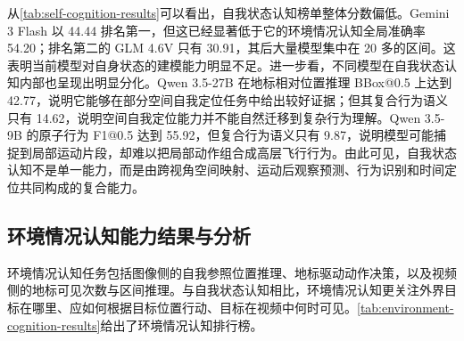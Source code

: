 从\autoref{tab:self-cognition-results}可以看出，自我状态认知榜单整体分数偏低。Gemini 3 Flash 以 44.44 排名第一，但这已经显著低于它的环境情况认知全局准确率 54.20；排名第二的 GLM 4.6V 只有 30.91，其后大量模型集中在 20 多的区间。这表明当前模型对自身状态的建模能力明显不足。进一步看，不同模型在自我状态认知内部也呈现出明显分化。Qwen 3.5-27B 在地标相对位置推理 BBox@0.5 上达到 42.77，说明它能够在部分空间自我定位任务中给出较好证据；但其复合行为语义只有 14.62，说明空间自我定位能力并不能自然迁移到复杂行为理解。Qwen 3.5-9B 的原子行为 F1@0.5 达到 55.92，但复合行为语义只有 9.87，说明模型可能捕捉到局部运动片段，却难以把局部动作组合成高层飞行行为。由此可见，自我状态认知不是单一能力，而是由跨视角空间映射、运动后观察预测、行为识别和时间定位共同构成的复合能力。

\subsection{环境情况认知能力结果与分析}

环境情况认知任务包括图像侧的自我参照位置推理、地标驱动动作决策，以及视频侧的地标可见次数与区间推理。与自我状态认知相比，环境情况认知更关注外界目标在哪里、应如何根据目标位置行动、目标在视频中何时可见。\autoref{tab:environment-cognition-results}给出了环境情况认知排行榜。

